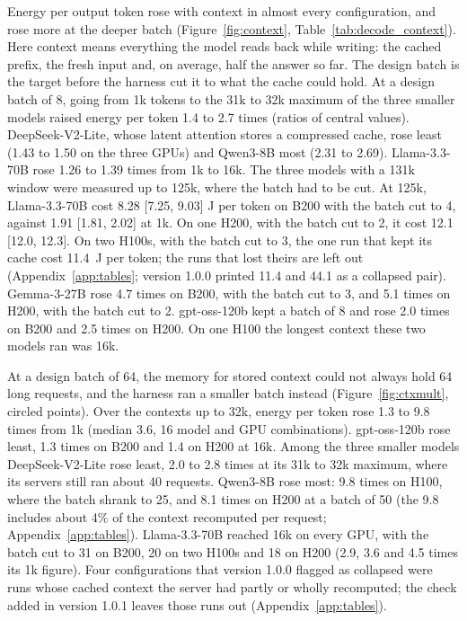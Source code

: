 \documentclass[11pt]{article}
\begin{document}
Energy per output token rose with context in almost every configuration, and rose more at the deeper batch (Figure~\ref{fig:context}, Table~\ref{tab:decode_context}). Here context means everything the model reads back while writing: the cached prefix, the fresh input and, on average, half the answer so far. The design batch is the target before the harness cut it to what the cache could hold. At a design batch of 8, going from 1k tokens to the 31k to 32k maximum of the three smaller models raised energy per token 1.4 to 2.7 times (ratios of central values). DeepSeek-V2-Lite, whose latent attention stores a compressed cache, rose least (1.43 to 1.50 on the three GPUs) and Qwen3-8B most (2.31 to 2.69). Llama-3.3-70B rose 1.26 to 1.39 times from 1k to 16k. The three models with a 131k window were measured up to 125k, where the batch had to be cut. At 125k, Llama-3.3-70B cost 8.28 [7.25, 9.03] J per token on B200 with the batch cut to 4, against 1.91 [1.81, 2.02] at 1k. On one H200, with the batch cut to 2, it cost 12.1 [12.0, 12.3]. On two H100s, with the batch cut to 3, the one run that kept its cache cost 11.4~J per token; the runs that lost theirs are left out (Appendix~\ref{app:tables}; version 1.0.0 printed 11.4 and 44.1 as a collapsed pair). Gemma-3-27B rose 4.7 times on B200, with the batch cut to 3, and 5.1 times on H200, with the batch cut to 2. gpt-oss-120b kept a batch of 8 and rose 2.0 times on B200 and 2.5 times on H200. On one H100 the longest context these two models ran was 16k.

At a design batch of 64, the memory for stored context could not always hold 64 long requests, and the harness ran a smaller batch instead (Figure~\ref{fig:ctxmult}, circled points). Over the contexts up to 32k, energy per token rose 1.3 to 9.8 times from 1k (median 3.6, 16 model and GPU combinations). gpt-oss-120b rose least, 1.3 times on B200 and 1.4 on H200 at 16k. Among the three smaller models DeepSeek-V2-Lite rose least, 2.0 to 2.8 times at its 31k to 32k maximum, where its servers still ran about 40 requests. Qwen3-8B rose most: 9.8 times on H100, where the batch shrank to 25, and 8.1 times on H200 at a batch of 50 (the 9.8 includes about 4\% of the context recomputed per request; Appendix~\ref{app:tables}). Llama-3.3-70B reached 16k on every GPU, with the batch cut to 31 on B200, 20 on two H100s and 18 on H200 (2.9, 3.6 and 4.5 times its 1k figure). Four configurations that version 1.0.0 flagged as collapsed were runs whose cached context the server had partly or wholly recomputed; the check added in version 1.0.1 leaves those runs out (Appendix~\ref{app:tables}).
\end{document}
